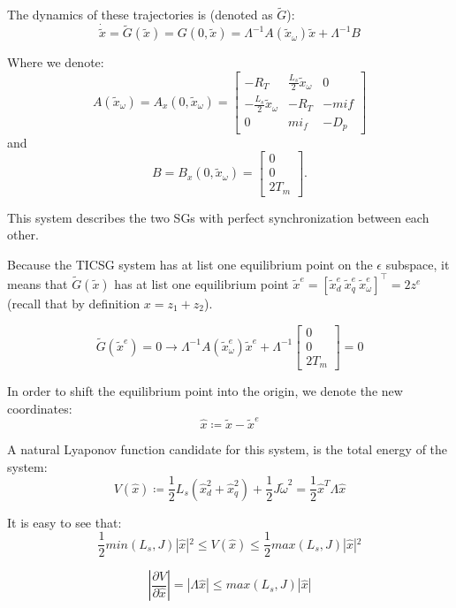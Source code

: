 \documentclass[letterpaper, 10 pt, conference]{ieeeconf}  %
\begin{document}
The dynamics of these trajectories is (denoted as $\tilde{G}$):
$$
\dot{\tilde{x}}=\tilde{G}(\tilde{x})=G(0,\tilde{x})=
 \Lambda^{-1} A\left( \tilde{x}_\omega \right) \tilde{x}+\Lambda^{-1} B 
$$

Where we denote:
$$
A\left( \tilde{x}_\omega \right)=A_x\left(0, \tilde{x}_\omega \right) =  
 \left[\begin{array}{ccc}
-R_T & \frac{L_{s}}{2}\tilde{x}_{\omega} & 0\\
-\frac{L_{s}}{2}\tilde{x}_{\omega} & -R_T & -mif\\
0 & mi_{f} & -D_{p}
\end{array}\right]
$$
and
$$
B = B_x\left(0, \tilde{x}_\omega \right)  =  
 \left[\begin{array}{c}
0\\
0\\
2T_{m}
\end{array}\right].
$$

This system describes the two SGs with perfect synchronization between each other.

Because the TICSG system has at list one equilibrium point on the $\epsilon$ subspace, it means that $\tilde{G}(\tilde{x})$ has at list one equilibrium point 
$\tilde{x}^{e}=\left[\tilde{x}_{d}^{e}\ \tilde{x}_{q}^{e}\ \tilde{x}_{\omega}^{e} \right]^\top = 2z^e$ (recall that by definition $x = z_1 + z_2$).

\begin{equation}
\tilde{G}(\tilde{x}^{e})=0\rightarrow\varLambda^{-1}A(\tilde{x}_{\omega}^{e})\tilde{x}^{e}+\varLambda^{-1}\left[\begin{array}{c}
0\\
0\\
2T_{m}
\end{array}\right]=0\label{eq:G_at_equilibrium}
\end{equation}

In order to shift the equilibrium point into the origin, we denote the new  coordinates:
$$
\hat{x}\coloneqq\tilde{x}-\tilde{x}^{e}
$$

A natural Lyaponov function candidate for this system, is the total energy of the system:
$$
V(\hat{x})\coloneqq\frac{1}{2}L_{s}\left(\hat{x}_{d}^{2}+\hat{x}_{q}^{2}\right)+\frac{1}{2}J\tilde{\omega}^{2}=\frac{1}{2}\hat{x}^{T}\varLambda\hat{x}
$$

It is easy to see that:
$$
\frac{1}{2} min(L_{s},J)|\hat{x}|{}^{2}\leq V(\hat{x})\leq \frac{1}{2} max(L_{s},J)|\hat{x}|{}^{2}
$$

$$
\left|\frac{\partial V}{\partial\hat{x}}\right|=\left|\varLambda\hat{x}\right|\leq max(L_{s},J)\left|\hat{x}\right|
$$
\end{document}
